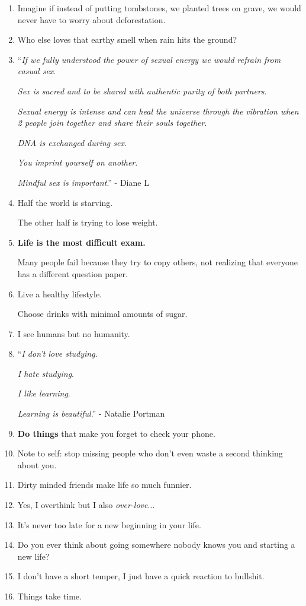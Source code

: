 \documentclass{article}
\numberwithin{equation}{section}
\begin{document}
\begin{enumerate}
    Psychotherapist is 1 word! 1 word!!! [Psycho the rapist]
    \item Imagine if instead of putting tombstones, we planted trees on grave, we would never have to worry about deforestation.
    \item Who else loves that earthy smell when rain hits the ground?
    \item ``\textit{If we fully understood the power of sexual energy we would refrain from casual sex}.
    
    \textit{Sex is sacred and to be shared with authentic purity of both partners}.
    
    \textit{Sexual energy is intense and can heal the universe through the vibration when 2 people join together and share their souls together}.
    
    \textit{DNA is exchanged during sex}.
    
    \textit{You imprint yourself on another}.
    
    \textit{Mindful sex is important}.'' - Diane L
    \item Half the world is starving.
    
    The other half is trying to lose weight.
    \item \textbf{Life is the most difficult exam.}
    
    Many people fail because they try to copy others, not realizing that everyone has a different question paper.
    \item Live a healthy lifestyle.
    
    Choose drinks with minimal amounts of sugar.
    \item I see humans but no humanity.
    \item ``\textit{I don't love studying}.
    
    \textit{I hate studying}.
    
    \textit{I like learning}.
    
    \textit{Learning is beautiful}.'' - Natalie Portman
    \item \textbf{Do things} that make you forget to check your phone.
    \item Note to self: stop missing people who don't even waste a second thinking about you.
    \item Dirty minded friends make life so much funnier.
    \item Yes, I overthink but I also \textit{over-love}$\ldots$
    \item It's never too late for a new beginning in your life.
    \item Do you ever think about going somewhere nobody knows you and starting a new life?
    \item I don't have a short temper, I just have a quick reaction to bullshit.
    \item Things take time.
    

\end{enumerate}
\end{document}
